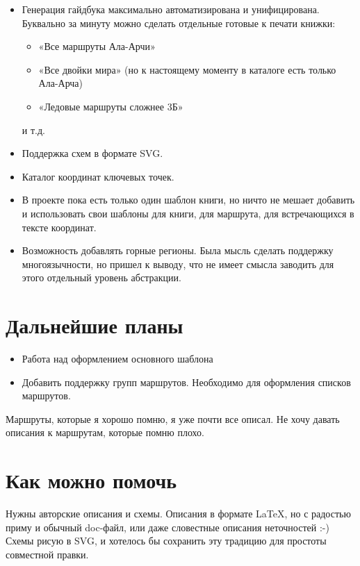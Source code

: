 \documentclass[11pt,fleqn]{report} %
\begin{document}
\begin{itemize}

\item Генерация гайдбука максимально автоматизирована и унифицирована.
  Буквально за минуту можно сделать отдельные готовые к печати книжки:

  \begin{itemize}
  \item «Все маршруты Ала-Арчи»
  \item «Все двойки мира» (но к настоящему моменту в каталоге есть
    только Ала-Арча)
  \item «Ледовые маршруты сложнее 3Б»
  \end{itemize}
  и т.д.

\item Поддержка схем в формате SVG.
  
\item Каталог координат ключевых точек.

\item В проекте пока есть только один шаблон книги, но ничто не мешает
  добавить и использовать свои шаблоны для книги, для маршрута, для
  встречающихся в тексте координат.

\item Возможность добавлять горные регионы. Была мысль сделать
  поддержку многоязычности, но пришел к выводу, что не имеет смысла
  заводить для этого отдельный уровень абстракции.
  
\end{itemize}

\section{Дальнейшие планы}

\begin{itemize}
\item Работа над оформлением основного шаблона
\item Добавить поддержку групп маршрутов. Необходимо для оформления
  списков маршрутов.
\end{itemize}

Маршруты, которые я хорошо помню, я уже почти все описал. Не хочу
давать описания к маршрутам, которые помню плохо.

\section{Как можно помочь}

Нужны авторские описания и схемы. Описания в формате \LaTeX, но с
радостью приму и обычный doc-файл, или даже словестные описания
неточностей :-) Схемы рисую в SVG, и хотелось бы сохранить эту
традицию для простоты совместной правки.
\end{document}
